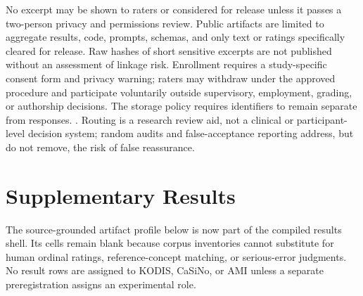 No excerpt may be shown to raters or considered for release unless it passes a two-person privacy and permissions review. Public artifacts are limited to aggregate results, code, prompts, schemas, and only text or ratings specifically cleared for release. Raw hashes of short sensitive excerpts are not published without an assessment of linkage risk. Enrollment requires a study-specific consent form and privacy warning; raters may withdraw under the approved procedure and participate voluntarily outside supervisory, employment, grading, or authorship decisions. The storage policy requires identifiers to remain separate from responses. . Routing is a research review aid, not a clinical or participant-level decision system; random audits and false-acceptance reporting address, but do not remove, the risk of false reassurance.

\section{Supplementary Results}
\label{sec:appendix_results}

The source-grounded artifact profile below is now part of the compiled results
shell. Its cells remain blank because corpus inventories cannot substitute for
human ordinal ratings, reference-concept matching, or serious-error judgments.
No result rows are assigned to KODIS, CaSiNo, or AMI unless a separate
preregistration assigns an experimental role.




